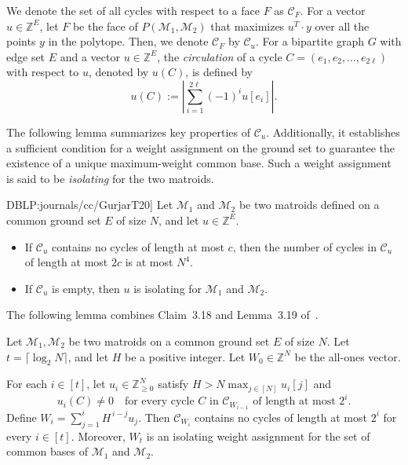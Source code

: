 \documentclass[11pt]{article}
\newcommand{\Z}{\mathbb{Z}}
\begin{document}
We denote the set of all cycles with respect to a face $F$ as $\mathcal{C}_F$. For a vector $u\in \Z^E$, let $F$ be the face of $P(\mathcal{M}_1,\mathcal{M}_2)$ that maximizes $u^T\cdot y$ over all the points $y$ in the polytope. Then, we denote $\mathcal{C}_F$ by $\mathcal{C}_u$. For a bipartite graph $G$ with edge set $E$ and a vector $u\in \Z^E$, the \emph{circulation} of a cycle $C=(e_1,e_2,\dots,e_{2\ell})$ with respect to $u$, denoted by $u(C)$, is defined by
\[
u(C):=\left|\sum_{i=1}^{2\ell} (-1)^i u[e_i]\right|.
\]

The following lemma summarizes key properties of $\mathcal{C}_u$. Additionally, it establishes a sufficient condition for a weight assignment on the ground set to guarantee the existence of a unique maximum-weight common base. Such a weight assignment is said to be \emph{isolating} for the two matroids.

\begin{lemma}[\cite[Corollary~3.10 and Lemma~3.14]{DBLP:journals/cc/GurjarT20}] \label{lem:nocycleIsolating}
Let $\mathcal{M}_1$ and $\mathcal{M}_2$ be two matroids defined on a common ground set $E$ of size $N$, and let $u\in \mathbb{Z}^E$.
\begin{itemize}
    \item If $\mathcal{C}_{u}$ contains no cycles of length at most $c$, then the number of cycles in $\mathcal{C}_{u}$ of length at most $2c$ is at most $N^4$.
    \item If $\mathcal{C}_{u}$ is empty, then $u$ is isolating for $\mathcal{M}_1$ and $\mathcal{M}_2$.
\end{itemize}
\end{lemma}

The following lemma combines Claim~3.18 and Lemma~3.19 of~\cite{DBLP:journals/cc/GurjarT20}.

\begin{lemma}\label{lem:GT1}
Let $\mathcal{M}_1,\mathcal{M}_2$ be two matroids on a common ground set $E$ of size $N$. 
Let $t=\lceil \log_2 N\rceil$, and let $H$ be a positive integer. 
Let $W_0\in \Z^N$ be the all-ones vector.

For each $i\in [t]$, let $u_i\in \Z_{\geq 0}^N$ satisfy $H > N \max_{j\in [N]} u_i[j]$ and
\[
u_i(C)\neq 0 \quad \text{for every cycle $C$ in $\mathcal{C}_{W_{i-1}}$ of length at most $2^i$.}
\]
Define $W_i = \sum_{j=1}^i H^{\,i-j} u_j$.
Then $\mathcal{C}_{W_i}$ contains no cycles of length at most $2^i$ for every $i\in [t]$. Moreover, $W_t$ is an isolating weight assignment for the set of common bases of $\mathcal{M}_1$ and $\mathcal{M}_2$.
\end{lemma}
\end{document}
